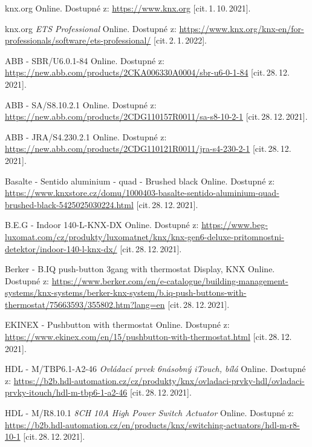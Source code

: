 \begin{thebibliography}{99}
		knx.org\/ Online.
		Dostupné z:
    \url{https://www.knx.org}
		[cit.\,1.\,10.\,2021]. 
    
		knx.org \emph{ETS Professional}\/ Online.
		Dostupné z:
    \url{https://www.knx.org/knx-en/for-professionals/software/ets-professional/}
		[cit.\,2.\,1.\,2022]. 

		ABB - SBR/U6.0.1-84\/ Online. 
		Dostupné z:
    \url{https://new.abb.com/products/2CKA006330A0004/sbr-u6-0-1-84}
		[cit.\,28.\,12.\,2021].
    
		ABB - SA/S8.10.2.1\/ Online.
		Dostupné z:
    \url{https://new.abb.com/products/2CDG110157R0011/sa-s8-10-2-1}
		[cit.\,28.\,12.\,2021]. 
    
		ABB - JRA/S4.230.2.1\/ Online. 
		Dostupné z:
    \url{https://new.abb.com/products/2CDG110121R0011/jra-s4-230-2-1}
		[cit.\,28.\,12.\,2021].
    
		Basalte - Sentido aluminium - quad - Brushed black\/ Online.
		Dostupné z:
    \url{https://www.knxstore.cz/domu/1000403-basalte-sentido-aluminium-quad-brushed-black-5425025030224.html}
		[cit.\,28.\,12.\,2021]. 
    
		B.E.G - Indoor 140-L-KNX-DX\/ Online. 
		Dostupné z:
    \url{https://www.beg-luxomat.com/cz/produkty/luxomatnet/knx/knx-gen6-deluxe-pritomnostni-detektor/indoor-140-l-knx-dx/}
		[cit.\,28.\,12.\,2021].  
    
		Berker - B.IQ push-button 3gang with thermostat Display, KNX\/ Online. 
		Dostupné z:
    \url{https://www.berker.com/en/e-catalogue/building-management-systems/knx-systems/berker-knx-system/b.iq-push-buttons-with-thermostat/75663593/355802.htm?lang=en}
		[cit.\,28.\,12.\,2021].
    
		EKINEX - Pushbutton with thermostat\/ Online. 
		Dostupné z:
    \url{https://www.ekinex.com/en/15/pushbutton-with-thermostat.html}
		[cit.\,28.\,12.\,2021].
    
        HDL - M/TBP6.1-A2-46 \textit{Ovládací prvek 6násobný iTouch, bílá}\/ Online. 
		Dostupné z:
    \url{https://b2b.hdl-automation.cz/cz/produkty/knx/ovladaci-prvky-hdl/ovladaci-prvky-itouch/hdl-m-tbp6-1-a2-46}
		[cit.\,28.\,12.\,2021].
    
        HDL - M/R8.10.1 \textit{8CH 10A High Power Switch Actuator}\/ Online. 
		Dostupné z:
    \url{https://b2b.hdl-automation.cz/en/products/knx/switching-actuators/hdl-m-r8-10-1}
		[cit.\,28.\,12.\,2021].
    

\end{thebibliography}
